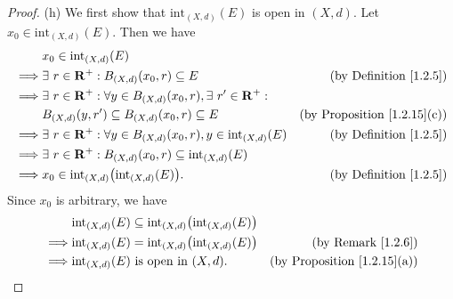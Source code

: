 \begin{proof}{(h)}
    We first show that \(\text{int}_{(X, d)}(E)\) is open in \((X, d)\).
    Let \(x_0 \in \text{int}_{(X, d)}(E)\).
    Then we have
    \begin{align*}
                 & x_0 \in \text{int}_{(X, d)}(E)                                                                                                 \\
        \implies & \exists\ r \in \mathbf{R}^+ : B_{(X, d)}(x_0, r) \subseteq E                                 & \text{(by Definition \ref{1.2.5})}      \\
        \implies & \exists\ r \in \mathbf{R}^+ : \forall y \in B_{(X, d)}(x_0, r), \exists\ r' \in \mathbf{R}^+ :                                                 \\
                 & B_{(X, d)}(y, r') \subseteq B_{(X, d)}(x_0, r) \subseteq E                           & \text{(by Proposition \ref{1.2.15}(c))} \\
        \implies & \exists\ r \in \mathbf{R}^+ : \forall y \in B_{(X, d)}(x_0, r), y \in \text{int}_{(X, d)}(E) & \text{(by Definition \ref{1.2.5})}      \\
        \implies & \exists\ r \in \mathbf{R}^+ : B_{(X, d)}(x_0, r) \subseteq \text{int}_{(X, d)}(E)                                                      \\
        \implies & x_0 \in \text{int}_{(X, d)}\big(\text{int}_{(X, d)}(E)\big).                         & \text{(by Definition \ref{1.2.5})}
    \end{align*}
    Since \(x_0\) is arbitrary, we have
    \begin{align*}
                 & \text{int}_{(X, d)}(E) \subseteq \text{int}_{(X, d)}\big(\text{int}_{(X, d)}(E)\big)                                           \\
        \implies & \text{int}_{(X, d)}(E) = \text{int}_{(X, d)}\big(\text{int}_{(X, d)}(E)\big)         & \text{(by Remark \ref{1.2.6})}          \\
        \implies & \text{int}_{(X, d)}(E) \text{ is open in } (X, d).                                   & \text{(by Proposition \ref{1.2.15}(a))}
    \end{align*}


\end{proof}
